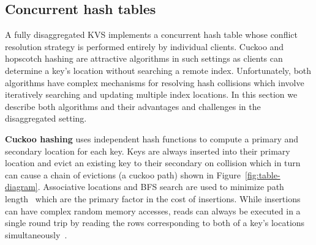 \subsection{Concurrent hash tables} 
\label{sec:cuckoo-back}

A fully disaggregated KVS implements a concurrent hash table whose
conflict resolution strategy is performed entirely by individual
clients.
Cuckoo and hopscotch hashing are attractive algorithms in such
settings as clients can determine a key's location without searching a
remote index. Unfortunately, both algorithms have complex mechanisms
for resolving hash collisions which involve iteratively searching and
updating multiple index locations. In this section we describe both
algorithms and their advantages and challenges in the disaggregated
setting.





\textbf{Cuckoo hashing} uses independent hash functions to compute a primary and secondary location
for each key. Keys are always inserted into their primary location and evict an existing key to
their secondary on collision which in turn can cause a chain of evictions (a cuckoo path) shown in
Figure~\ref{fig:table-diagram}. Associative locations and BFS search are used to minimize path
length~\cite{memc3,cuckoo-improvements} which are the primary factor in the cost of insertions.
While insertions can have complex random memory accesses, reads can always be executed in a single
round trip by reading the rows corresponding to both of a key's locations
simultaneously~\cite{memc3,cuckoo-improvements,pilaf}.

